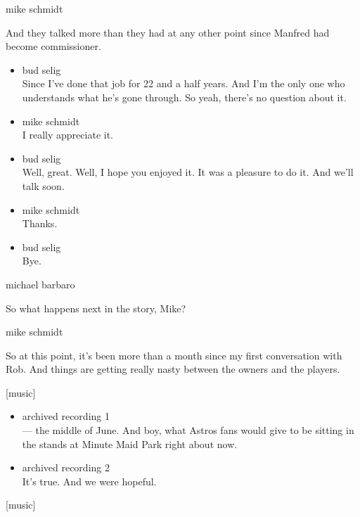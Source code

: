 mike schmidt

And they talked more than they had at any other point since Manfred had
become commissioner.

\begin{itemize}
\item
  bud selig\\
  Since I've done that job for 22 and a half years. And I'm the only one
  who understands what he's gone through. So yeah, there's no question
  about it.
\item
  mike schmidt\\
  I really appreciate it.
\item
  bud selig\\
  Well, great. Well, I hope you enjoyed it. It was a pleasure to do it.
  And we'll talk soon.
\item
  mike schmidt\\
  Thanks.
\item
  bud selig\\
  Bye.
\end{itemize}

michael barbaro

So what happens next in the story, Mike?

mike schmidt

So at this point, it's been more than a month since my first
conversation with Rob. And things are getting really nasty between the
owners and the players.

{[}music{]}

\begin{itemize}
\item
  archived recording 1\\
  --- the middle of June. And boy, what Astros fans would give to be
  sitting in the stands at Minute Maid Park right about now.
\item
  archived recording 2\\
  It's true. And we were hopeful.
\end{itemize}

{[}music{]}

